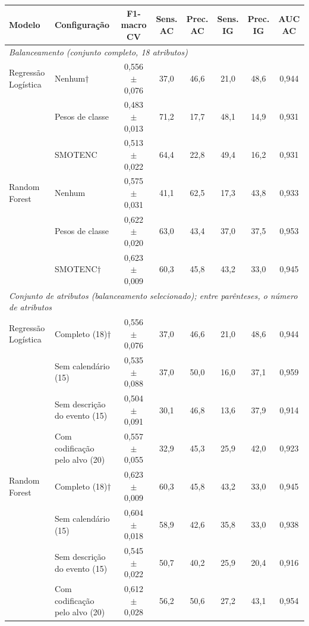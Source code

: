 \begin{tabular}{llcccccc}
\toprule
\textbf{Modelo} & \textbf{Configuração} & \textbf{F1-macro CV} & \textbf{Sens. AC} & \textbf{Prec. AC} & \textbf{Sens. IG} & \textbf{Prec. IG} & \textbf{AUC AC} \\
\midrule
\multicolumn{8}{l}{\textit{Balanceamento (conjunto completo, 18 atributos)}} \\
\midrule
Regressão Logística & Nenhum$\dagger$ & 0,556 $\pm$ 0,076 & 37,0 & 46,6 & 21,0 & 48,6 & 0,944 \\
 & Pesos de classe & 0,483 $\pm$ 0,013 & 71,2 & 17,7 & 48,1 & 14,9 & 0,931 \\
 & SMOTENC & 0,513 $\pm$ 0,022 & 64,4 & 22,8 & 49,4 & 16,2 & 0,931 \\
\midrule
Random Forest & Nenhum & 0,575 $\pm$ 0,031 & 41,1 & 62,5 & 17,3 & 43,8 & 0,933 \\
 & Pesos de classe & 0,622 $\pm$ 0,020 & 63,0 & 43,4 & 37,0 & 37,5 & 0,953 \\
 & SMOTENC$\dagger$ & 0,623 $\pm$ 0,009 & 60,3 & 45,8 & 43,2 & 33,0 & 0,945 \\
\midrule
\multicolumn{8}{l}{\textit{Conjunto de atributos (balanceamento selecionado); entre parênteses, o número de atributos}} \\
\midrule
Regressão Logística & Completo (18)$\dagger$ & 0,556 $\pm$ 0,076 & 37,0 & 46,6 & 21,0 & 48,6 & 0,944 \\
 & Sem calendário (15) & 0,535 $\pm$ 0,088 & 37,0 & 50,0 & 16,0 & 37,1 & 0,959 \\
 & Sem descrição do evento (15) & 0,504 $\pm$ 0,091 & 30,1 & 46,8 & 13,6 & 37,9 & 0,914 \\
 & Com codificação pelo alvo (20) & 0,557 $\pm$ 0,055 & 32,9 & 45,3 & 25,9 & 42,0 & 0,923 \\
\midrule
Random Forest & Completo (18)$\dagger$ & 0,623 $\pm$ 0,009 & 60,3 & 45,8 & 43,2 & 33,0 & 0,945 \\
 & Sem calendário (15) & 0,604 $\pm$ 0,018 & 58,9 & 42,6 & 35,8 & 33,0 & 0,938 \\
 & Sem descrição do evento (15) & 0,545 $\pm$ 0,022 & 50,7 & 40,2 & 25,9 & 20,4 & 0,916 \\
 & Com codificação pelo alvo (20) & 0,612 $\pm$ 0,028 & 56,2 & 50,6 & 27,2 & 43,1 & 0,954 \\
\bottomrule
\end{tabular}
